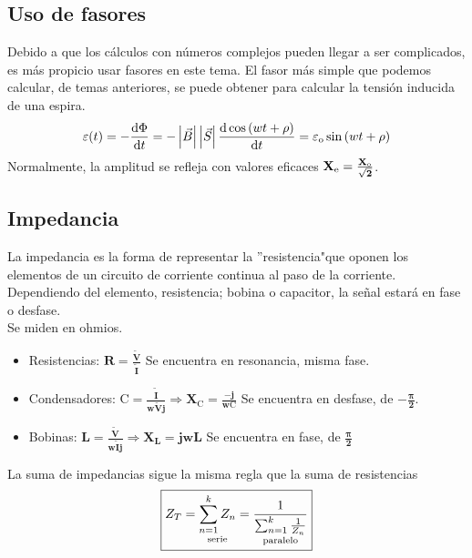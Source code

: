 \subsection{Uso de fasores}
\noindent Debido a que los cálculos con números complejos pueden llegar a ser complicados, es más propicio usar fasores en este tema. El fasor más simple que podemos calcular, de temas anteriores, se puede obtener para calcular la tensión inducida de una espira.
\[
        \varepsilon (t) = -\frac{\mathrm{d} \Phi}{\mathrm{d} t} = -\left | \vec{B} \right |\left | \vec{S} \right |\frac{\mathrm{d} \cos{(wt+\rho )}}{\mathrm{d} t} = \varepsilon_{\textnormal{o}}\sin{(wt + \rho)}
\]
\noindent Normalmente, la amplitud se refleja con valores eficaces \(\mathbf{X_{\textnormal{e}} = \frac{X_{\textnormal{o}}}{\sqrt{2}}}\).
\subsection{Impedancia}
\noindent La impedancia es la forma de representar la ''resistencia"\space que oponen los elementos de un circuito de corriente continua al paso de la corriente.\\
Dependiendo del elemento, resistencia; bobina o capacitor, la señal estará en fase o desfase.\\ Se miden en ohmios.
\begin{itemize}
        \item Resistencias:
              \(\boxed{\mathbf{R = \frac{\tilde{V}}{\tilde{I}}}}\) Se encuentra en resonancia, misma fase.
        \item Condensadores:
              \(\boxed{\mathbf{\mathrm{C} = \frac{\tilde{I}}{w\tilde{V}j} \Rightarrow X_{\mathrm{C}} = \frac{-j}{w\mathrm{C}}}}\) Se encuentra en desfase, de \(\mathbf{-\frac{\pi}{2}}\).
        \item Bobinas:
              \(\boxed{\mathbf{L = \frac{\tilde{V}}{w\tilde{I}j} \Rightarrow X_L =jwL}}\) Se encuentra en fase, de \(\mathbf{\frac{\pi}{2}}\)
\end{itemize}
La suma de impedancias sigue la misma regla que la suma de resistencias \[
        \boxed{Z_T = \underset{\textnormal{serie}}{\sum_{n=1}^{k} Z_n} = \underset{\textnormal{paralelo}}{\frac{1}{\sum_{n=1}^{k}\frac{1}{Z_n}}}}
\]
